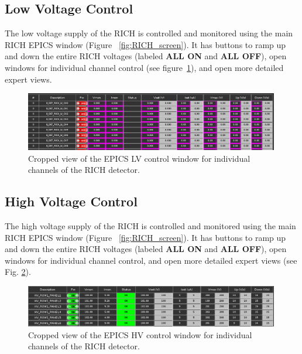 \documentclass[12pt]{article}
\begin{document}
\subsection{ Low Voltage Control}

The low voltage supply of the RICH is controlled and monitored using the main RICH
EPICS window (Figure ~\ref{fig:RICH_screen}). It has buttons to ramp up and down the entire 
RICH voltages (labeled {\bf ALL ON} and {\bf ALL OFF}), open windows for
individual channel control (see  figure~\ref{LVControl}), and open more detailed expert views.

\begin{figure}[htbp]
\center
\includegraphics[width=0.99\textwidth]{Justin_plots/LVallChannels.png}
\caption{ \label{LVControl} Cropped view of the EPICS LV control window for individual channels of the RICH detector.}
\end{figure}

\subsection{ High Voltage Control}

The high voltage supply of the RICH is controlled and monitored using the main RICH
EPICS window (Figure ~\ref{fig:RICH_screen}).  It has buttons to ramp up and down the entire 
RICH voltages (labeled {\bf ALL ON} and {\bf ALL OFF}), open windows for
individual channel control, and open more detailed expert views (see Fig. \ref{HVControl}).
\begin{figure}[htbp]
\center
\includegraphics[width=0.99\textwidth]{Justin_plots/HVControlsNumbers.PNG}
\caption{ \label{HVControl} Cropped view of the EPICS HV control window for individual channels of the RICH detector.}
\end{figure}
\end{document}
